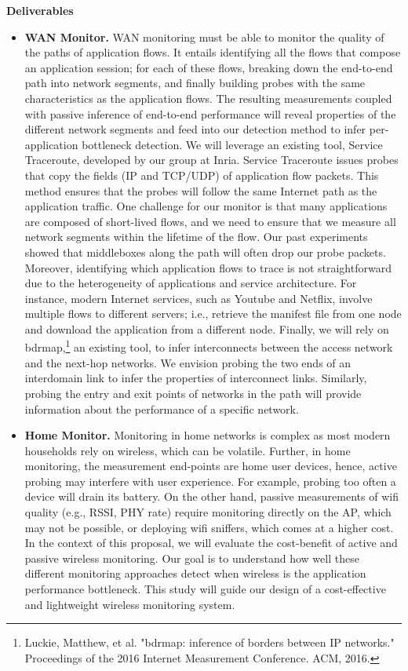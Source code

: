 \documentclass[11 pt]{article}
\begin{document}
\textbf{Deliverables}

\begin{itemize}
\item \textbf{WAN Monitor.} WAN monitoring must be able to monitor the quality of the paths of application flows. It entails identifying all the flows that compose an application session; for each of these flows, breaking down the end-to-end path into network segments, and finally building probes with the same characteristics as the application flows. The resulting measurements coupled with passive inference of end-to-end performance will reveal properties of the different network segments and feed into our detection method to infer per-application bottleneck detection. We will leverage an existing tool, Service Traceroute, developed by our group at Inria. Service Traceroute issues probes that copy the fields (IP and TCP/UDP) of application flow packets. This method ensures that the probes will follow the same Internet path as the application traffic. One challenge for our monitor is that many applications are composed of short-lived flows, and we need to ensure that we measure all network segments within the lifetime of the flow. Our past experiments showed that middleboxes along the path will often drop our probe packets. Moreover, identifying which application flows to trace is not straightforward due to the heterogeneity of applications and service architecture. For instance, modern Internet services, such as Youtube and Netflix, involve multiple flows to different servers; i.e., retrieve the manifest file from one node and download the application from a different node. Finally, we will rely on bdrmap,\footnote{Luckie, Matthew, et al. "bdrmap: inference of borders between IP networks." Proceedings of the 2016 Internet Measurement Conference. ACM, 2016.} an existing tool, to infer interconnects between the access network and the next-hop networks. We envision probing the two ends of an interdomain link to infer the properties of interconnect links. Similarly, probing the entry and exit points of networks in the path will provide information about the performance of a specific network.

\item \textbf{Home Monitor.} Monitoring in home networks is complex as most modern households rely on wireless, which can be volatile. Further, in home monitoring, the measurement end-points are home user devices, hence, active probing may interfere with user experience. For example, probing too often a device will drain its battery. On the other hand, passive measurements of wifi quality (e.g., RSSI, PHY rate) require monitoring directly on the AP, which may not be possible, or deploying wifi sniffers, which comes at a higher cost. In the context of this proposal, we will evaluate the cost-benefit of active and passive wireless monitoring. Our goal is to understand how well these different monitoring approaches detect when wireless is the application performance bottleneck. This study will guide our design of a cost-effective and lightweight wireless monitoring system.


\end{itemize}
\end{document}
